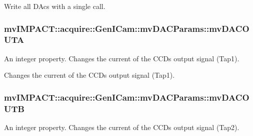 Write all D\+Acs with a single call. \hypertarget{classmv_i_m_p_a_c_t_1_1acquire_1_1_gen_i_cam_1_1mv_d_a_c_params_a414044d827c38e691569a7ad25d023a7}{
\subsubsection[{mv\+D\+A\+C\+O\+U\+T\+A}]{ mv\+I\+M\+P\+A\+C\+T\+::acquire\+::\+Gen\+I\+Cam\+::mv\+D\+A\+C\+Params\+::mv\+D\+A\+C\+O\+U\+T\+A}}\label{classmv_i_m_p_a_c_t_1_1acquire_1_1_gen_i_cam_1_1mv_d_a_c_params_a414044d827c38e691569a7ad25d023a7}


An integer property. Changes the current of the C\+C\+Ds output signal (Tap1). 

Changes the current of the C\+C\+Ds output signal (Tap1). \hypertarget{classmv_i_m_p_a_c_t_1_1acquire_1_1_gen_i_cam_1_1mv_d_a_c_params_a48d6d2524caef1b33bf23572aedae3a1}{
\subsubsection[{mv\+D\+A\+C\+O\+U\+T\+B}]{ mv\+I\+M\+P\+A\+C\+T\+::acquire\+::\+Gen\+I\+Cam\+::mv\+D\+A\+C\+Params\+::mv\+D\+A\+C\+O\+U\+T\+B}}\label{classmv_i_m_p_a_c_t_1_1acquire_1_1_gen_i_cam_1_1mv_d_a_c_params_a48d6d2524caef1b33bf23572aedae3a1}


An integer property. Changes the current of the C\+C\+Ds output signal (Tap2). 

